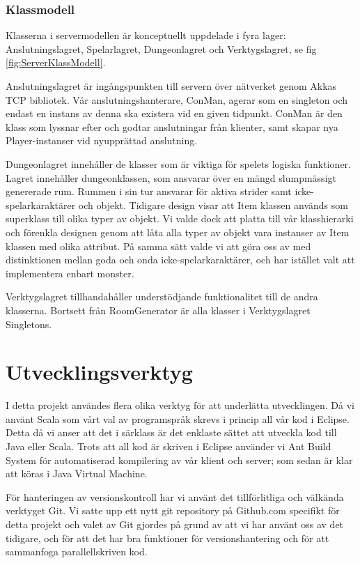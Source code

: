 \documentclass[a4paper]{article}
\begin{document}
\subsubsection{Klassmodell}
Klasserna i servermodellen är konceptuellt uppdelade i fyra lager: Anslutningslagret, Spelarlagret, Dungeonlagret och Verktygslagret, se fig \ref{fig:ServerKlassModell}. 

Anslutningslagret är ingångspunkten till servern över nätverket genom Akkas TCP bibliotek. Vår anslutningshanterare, ConMan, agerar som en singleton och endast en instans av denna ska existera vid en given tidpunkt. ConMan är den klass som lyssnar efter och godtar anslutningar från klienter, samt skapar nya Player-instanser vid nyupprättad anslutning. 

Dungeonlagret innehåller de klasser som är viktiga för spelets logiska funktioner. Lagret innehåller dungeonklassen, som ansvarar över en mängd slumpmässigt genererade rum. Rummen i sin tur ansvarar för aktiva strider samt icke-spelarkaraktärer och objekt. Tidigare design visar att Item klassen används som superklass till olika typer av objekt. Vi valde dock att platta till vår klasshierarki och förenkla designen genom att låta alla typer av objekt vara instanser av Item klassen med olika attribut. På samma sätt valde vi att göra oss av med distinktionen mellan goda och onda icke-spelarkaraktärer, och har istället valt att implementera enbart monster.

Verktygslagret tillhandahåller understödjande funktionalitet till de andra klasserna. Bortsett från RoomGenerator är alla klasser i Verktygslagret Singletons. 


\section{Utvecklingsverktyg}

I detta projekt användes flera olika verktyg för att underlätta utvecklingen. Då vi använt Scala som vårt val av programspråk skrevs i princip all vår kod i Eclipse. Detta då vi anser att det i särklass är det enklaste sättet att utveckla kod till Java eller Scala. Trots att all kod är skriven i Eclipse använder vi Ant Build System 
för automatiserad kompilering av vår klient och server; som sedan är klar att köras i Java Virtual Machine. 

För hanteringen av versionskontroll har vi använt det tillförlitliga och välkända verktyget Git. Vi satte upp ett nytt git repository på Github.com specifikt för detta projekt och valet av Git gjordes på grund av att vi har använt oss av det tidigare, och för att det har bra funktioner för versionshantering och för att sammanfoga parallellskriven kod. 
\end{document}
